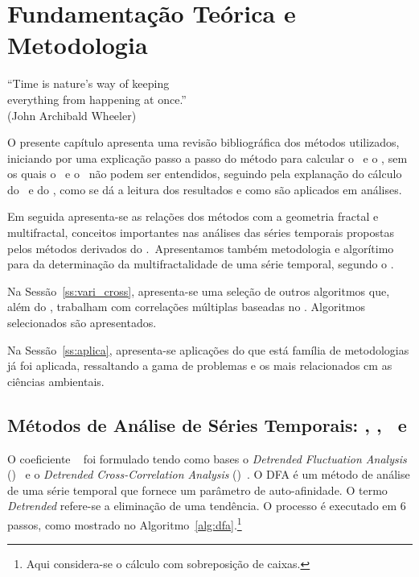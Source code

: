 \chapter{Fundamentação Teórica e Metodologia}
\label{cap:fund_teorica}

\begin{flushright}
  ``Time is nature's way of keeping \\
    everything from happening at once.''\\[10px]
  (John Archibald Wheeler)
\end{flushright}

O presente capítulo apresenta uma revisão bibliográfica dos métodos utilizados, iniciando por uma explicação passo a passo do método para calcular o \dfa~e o \dcca, sem os quais o \pdcca~e o \dmc~não podem ser entendidos, seguindo pela explanação do cálculo do \pdcca~e do \dmc, como se dá a leitura dos resultados e como são aplicados em análises.

Em seguida apresenta-se as relações dos métodos com a geometria fractal e multifractal, conceitos importantes nas análises das séries temporais propostas pelos métodos derivados do \dfa.~Apresentamos também metodologia e algorítimo para da determinação da multifractalidade de uma série temporal, segundo o \dfa.

Na Sessão~\ref{ss:vari_cross}, apresenta-se uma seleção de outros algoritmos que, além do \dmc, trabalham com correlações múltiplas baseadas no \dfa. Algoritmos selecionados são apresentados.

Na Sessão~\ref{ss:aplica}, apresenta-se aplicações do que está família de metodologias já foi aplicada, ressaltando a gama de problemas e os mais relacionados cm as ciências ambientais.

\section{Métodos de Análise de Séries Temporais: \dfa, \dcca, \pdcca~e \dmc}
\label{sec:dmc}

O coeficiente \pdcca~\cite{Zebende2011} foi formulado tendo como bases o \emph{Detrended Fluctuation Analysis} (\dfa)~\cite{Peng_1994} e o \emph{Detrended Cross-Correlation Analysis} (\dcca)~\cite{Podobnik2008}. O DFA é um método de análise de uma série temporal que fornece um parâmetro de auto-afinidade. O termo \emph{Detrended} refere-se a eliminação de uma tendência. O processo é executado em 6 passos, como mostrado no Algoritmo~\ref{alg:dfa}.\footnote{Aqui considera-se o cálculo com sobreposição de caixas.}


